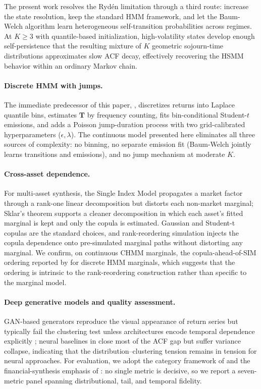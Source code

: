 The present work resolves the Ryd\'{e}n limitation through a third route: increase the state resolution, keep the standard HMM framework, and let the Baum-Welch algorithm learn heterogeneous self-transition probabilities across regimes.
At $K \geq 3$ with quantile-based initialization, high-volatility states develop enough self-persistence that the resulting mixture of $K$ geometric sojourn-time distributions approximates slow ACF decay, effectively recovering the HSMM behavior within an ordinary Markov chain.

\paragraph{Discrete HMM with jumps.}
The immediate predecessor of this paper, \citet{alswaidan2026hybrid}, discretizes returns into Laplace quantile bins, estimates $\mathbf{T}$ by frequency counting, fits bin-conditional Student-$t$ emissions, and adds a Poisson jump-duration process with two grid-calibrated hyperparameters ($\epsilon, \lambda$).
The continuous model presented here eliminates all three sources of complexity: no binning, no separate emission fit (Baum-Welch jointly learns transitions and emissions), and no jump mechanism at moderate $K$.

\paragraph{Cross-asset dependence.}
For multi-asset synthesis, the Single Index Model \cite{sharpe1963simplified} propagates a market factor through a rank-one linear decomposition but distorts each non-market marginal; Sklar's theorem \cite{sklar1959fonctions, nelsen2006introduction} supports a cleaner decomposition in which each asset's fitted marginal is kept and only the copula is estimated.
Gaussian and Student-t copulas \cite{demarta2005tcopula, mcneil2015quantitative} are the standard choices, and rank-reordering simulation \cite{iman1982distribution} injects the copula dependence onto pre-simulated marginal paths without distorting any marginal.
We confirm, on continuous CHMM marginals, the copula-ahead-of-SIM ordering reported by \citet{alswaidan2026hybrid} for discrete HMM marginals, which suggests that the ordering is intrinsic to the rank-reordering construction rather than specific to the marginal model.

\paragraph{Deep generative models and quality assessment.}
GAN-based generators reproduce the visual appearance of return series but typically fail the clustering test unless architectures encode temporal dependence explicitly \cite{takahashi2019modeling, kwon2024can}; neural baselines in \citet{alswaidan2026hybrid} close most of the ACF gap but suffer variance collapse, indicating that the distribution--clustering tension remains in tension for neural approaches.
For evaluation, we adopt the category framework of \citet{stenger2024thinking} and the financial-synthesis emphasis of \citet{assefa2020generating}: no single metric is decisive, so we report a seven-metric panel spanning distributional, tail, and temporal fidelity.
